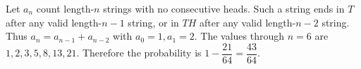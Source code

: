 Let $a_n$ count length-$n$ strings with no consecutive heads. Such a string ends in $T$ after any valid length-$n-1$ string, or in $TH$ after any valid length-$n-2$ string. Thus $a_n=a_{n-1}+a_{n-2}$ with $a_0=1,a_1=2$. The values through $n=6$ are $1,2,3,5,8,13,21$. Therefore the probability is $\boxed{1-\dfrac{21}{64}=\dfrac{43}{64}}$.
